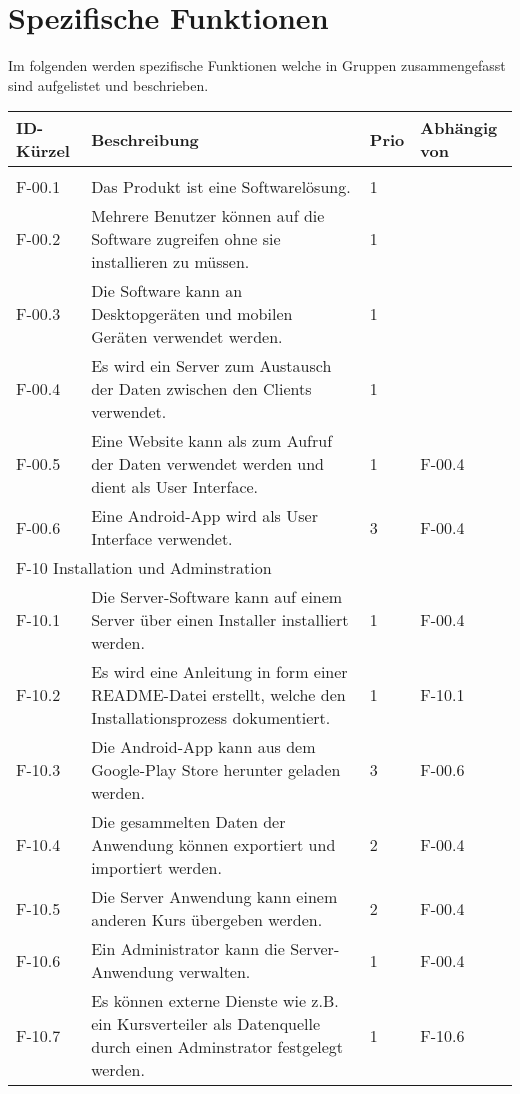 \newpage
\section{Spezifische Funktionen}
Im folgenden werden spezifische Funktionen welche in Gruppen zusammengefasst sind aufgelistet und beschrieben.
\begin{tabularx}{\textwidth}{|l|X|l|l|}
    \toprule
    \textbf{ID-Kürzel} & \textbf{Beschreibung} & \textbf{Prio} & \textbf{Abhängig von} \\
    \midrule
    \endhead
    \hline
    \caption{Functionen}
    \endfoot
    \multicolumn{4}{|l|}{F-00 Allgemein}\\
    \hline
    F-00.1 & Das Produkt ist eine Softwarelösung. & 1 & \\
    F-00.2 & Mehrere Benutzer können auf die Software zugreifen ohne sie installieren zu müssen. & 1 & \\
    F-00.3 & Die Software kann an Desktopgeräten und mobilen Geräten verwendet werden. & 1 & \\
    F-00.4 & Es wird ein Server zum Austausch der Daten zwischen den Clients verwendet. & 1 & \\
    F-00.5 & Eine Website kann als zum Aufruf der Daten verwendet werden und dient als User Interface. & 1 & F-00.4\\
    F-00.6 & Eine Android-App wird als User Interface verwendet. & 3 & F-00.4\\
    \hline
    \multicolumn{4}{|l|}{F-10 Installation und Adminstration}\\
    \hline
    F-10.1 & Die Server-Software kann auf einem Server über einen Installer installiert werden. & 1 & F-00.4 \\
    F-10.2 & Es wird eine Anleitung in form einer README-Datei erstellt, welche den Installationsprozess dokumentiert. & 1 & F-10.1\\
    F-10.3 & Die Android-App kann aus dem Google-Play Store herunter geladen werden. & 3 & F-00.6\\
    F-10.4 & Die gesammelten Daten der Anwendung können exportiert und importiert werden. & 2 & F-00.4\\
    F-10.5 & Die Server Anwendung kann einem anderen Kurs übergeben werden. & 2 & F-00.4\\
    F-10.6 & Ein Administrator kann die Server-Anwendung verwalten. & 1 & F-00.4\\
    F-10.7 & Es können externe Dienste wie z.B. ein Kursverteiler als Datenquelle durch einen Adminstrator festgelegt werden. & 1 & F-10.6\\


\end{tabularx}
